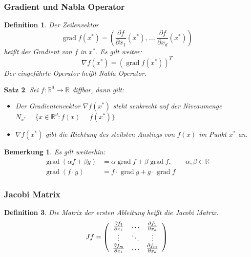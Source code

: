 \documentclass[12pt,a4paper]{article}%
\DeclareMathOperator{\grad}{grad}
\newtheorem{satz}{Satz}[section]
\newtheorem{definition}[satz]{Definition}
\newtheorem{bem}{Bemerkung}[section]
\numberwithin{equation}{section}
\newcommand{\R}{\mathbb{R}} %
\def\dfp#1#2{\frac{\partial #1}{\partial #2}}
\numberwithin{equation}{subsection}
\begin{document}
  \subsubsection{Gradient und Nabla Operator}
  \begin{definition}
    Der Zeilenvektor
    \begin{equation}
      \grad f(x^*) = \left( \dfp{f}{x_1}(x^*), ..., \dfp{f}{x_d}(x^*)\right)
    \end{equation}
    heißt der Gradient von $f$ in $x^*$. Es gilt weiter:
    \begin{equation}
      \nabla f(x^*) = (\grad f(x^*))^T
    \end{equation}
    Der eingeführte Operator heißt Nabla-Operator.
  \end{definition}
  \begin{satz}
    Sei $f:\R^d \rightarrow \R$ diffbar, dann gilt:
    \begin{itemize}
      \item[a) ] Der Gradientenvektor $\nabla f(x^*)$ steht senkrecht auf der Niveaumenge $N_{x^*} = \lbrace x \in \R^d: f(x) = f(x^*)\rbrace$
      \item[b) ] $\nabla f(x^*)$ gibt die Richtung des steilsten Anstiegs von $f(x)$ im Punkt $x^*$ an.
    \end{itemize}
  \end{satz}
  \begin{bem}
    Es gilt weiterhin:
    \begin{align}
      \grad(\alpha f + \beta g) &= \alpha \grad f + \beta \grad f, \qquad \alpha, \beta \in \R    \\  
      \grad (f\cdot g) &= f \cdot \grad g + g \cdot \grad f
    \end{align}
  \end{bem}
  
  \subsubsection{Jacobi Matrix}
  \begin{definition}
    Die Matrix der ersten Ableitung heißt die Jacobi Matrix. 
    \begin{equation}
      Jf = \left(\begin{array}{c c c}
      \dfp{f_1}{x_1} & \dots  & \dfp{f_1}{x_d} \\
      \vdots         & \ddots & \vdots         \\
      \dfp{f_m}{x_1} & \dots  & \dfp{f_m}{x_d} \end{array}\right)
    \end{equation}
  \end{definition}
  
\end{document}
